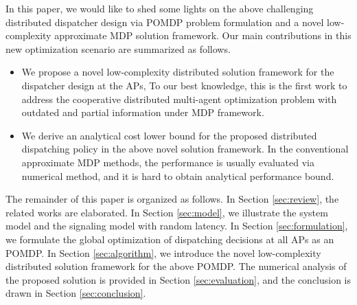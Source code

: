 In this paper, we would like to shed some lights on the above challenging distributed dispatcher design via POMDP problem formulation and a novel low-complexity approximate MDP solution framework.
Our main contributions in this new optimization scenario are summarized as follows.
\begin{itemize}
    \item We propose a novel low-complexity distributed solution framework for the dispatcher design at the APs, 
    To our best knowledge, this is the first work to address the cooperative distributed multi-agent optimization problem {with outdated and partial information} under MDP framework.
    \item We derive an analytical cost lower bound for the proposed distributed dispatching policy in the above novel solution framework. In the conventional approximate MDP methods, the performance is usually evaluated via numerical method, and it is hard to obtain analytical performance bound.
\end{itemize}

The remainder of this paper is organized as follows.
In Section \ref{sec:review}, the related works are elaborated.
In Section \ref{sec:model}, we illustrate the system model and the signaling model with random latency.
In Section \ref{sec:formulation}, we formulate the global optimization of dispatching decisions at all APs as an POMDP.
In Section \ref{sec:algorithm}, we introduce the novel low-complexity distributed solution framework for the above POMDP.
The numerical analysis of the proposed solution is provided in Section \ref{sec:evaluation}, and the conclusion is drawn in Section \ref{sec:conclusion}.

